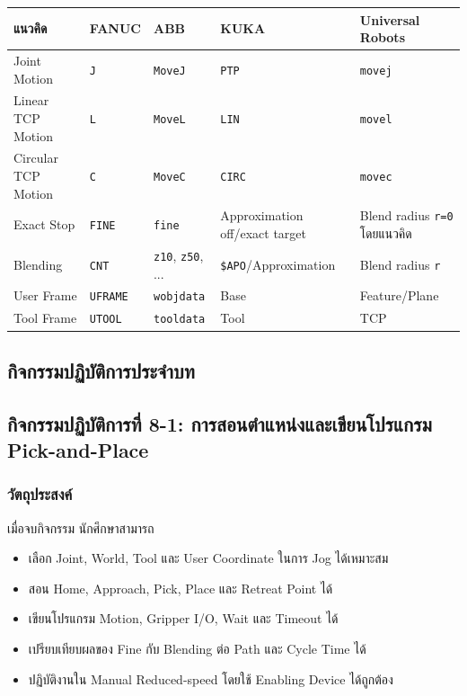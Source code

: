 \begin{table}[htbp]
    \centering
    \small
    \begin{tabularx}{\textwidth}{@{}L{0.22\textwidth}L{0.14\textwidth}L{0.17\textwidth}L{0.22\textwidth}Y@{}}
        \hline
        \textbf{แนวคิด} & \textbf{FANUC} & \textbf{ABB} & \textbf{KUKA} & \textbf{Universal Robots} \\
        \hline
        Joint Motion & \texttt{J} & \texttt{MoveJ} & \texttt{PTP} & \texttt{movej} \\
        Linear TCP Motion & \texttt{L} & \texttt{MoveL} & \texttt{LIN} & \texttt{movel} \\
        Circular TCP Motion & \texttt{C} & \texttt{MoveC} & \texttt{CIRC} & \texttt{movec} \\
        Exact Stop & \texttt{FINE} & \texttt{fine} & Approximation off/exact target & Blend radius \texttt{r=0} โดยแนวคิด \\
        Blending & \texttt{CNT} & \texttt{z10}, \texttt{z50}, ... & \texttt{\$APO}/Approximation & Blend radius \texttt{r} \\
        User Frame & \texttt{UFRAME} & \texttt{wobjdata} & Base & Feature/Plane \\
        Tool Frame & \texttt{UTOOL} & \texttt{tooldata} & Tool & TCP \\
        \hline
    \end{tabularx}
\end{table}

\newpage

\subsection{กิจกรรมปฏิบัติการประจำบท}

\subsection{กิจกรรมปฏิบัติการที่ 8-1: การสอนตำแหน่งและเขียนโปรแกรม Pick-and-Place}

\subsubsection{วัตถุประสงค์}

เมื่อจบกิจกรรม นักศึกษาสามารถ

\begin{itemize}
    \item เลือก Joint, World, Tool และ User Coordinate ในการ Jog ได้เหมาะสม
    \item สอน Home, Approach, Pick, Place และ Retreat Point ได้
    \item เขียนโปรแกรม Motion, Gripper I/O, Wait และ Timeout ได้
    \item เปรียบเทียบผลของ Fine กับ Blending ต่อ Path และ Cycle Time ได้
    \item ปฏิบัติงานใน Manual Reduced-speed โดยใช้ Enabling Device ได้ถูกต้อง
\end{itemize}

